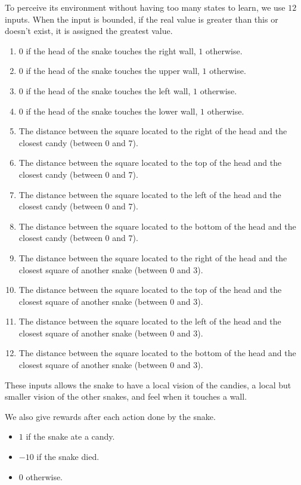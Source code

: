 \documentclass[journal, a4paper]{IEEEtran}
\begin{document}
To perceive its environment without having too many states to learn, we use $12$ inputs.
When the input is bounded, if the real value is greater than this or doesn't exist, it is assigned the greatest value.
\begin{enumerate}
    \item $0$ if the head of the snake touches the right wall, $1$ otherwise.
    \item $0$ if the head of the snake touches the upper wall, $1$ otherwise.
    \item $0$ if the head of the snake touches the left wall, $1$ otherwise.
    \item $0$ if the head of the snake touches the lower wall, $1$ otherwise.
    \item The distance between the square located to the right of the head and the closest candy (between $0$ and $7$).
    \item The distance between the square located to the top of the head and the closest candy (between $0$ and $7$).
    \item The distance between the square located to the left of the head and the closest candy (between $0$ and $7$).
    \item The distance between the square located to the bottom of the head and the closest candy (between $0$ and $7$).
    \item The distance between the square located to the right of the head and the closest square of another snake (between $0$ and $3$).
    \item The distance between the square located to the top of the head and the closest square of another snake (between $0$ and $3$).
    \item The distance between the square located to the left of the head and the closest square of another snake (between $0$ and $3$).
    \item The distance between the square located to the bottom of the head and the closest square of another snake (between $0$ and $3$).
\end{enumerate}
These inputs allows the snake to have a local vision of the candies, a local but smaller vision of the other snakes, and feel when it touches a wall.

We also give rewards after each action done by the snake.
\begin{itemize}
    \item $1$ if the snake ate a candy.
    \item $-10$ if the snake died.
    \item $0$ otherwise.
\end{itemize}
\end{document}

